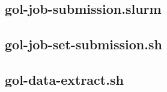 \documentclass[]{article}
\begin{document}


\newpage
\subsection{gol-job-submission.slurm}
\label{sec:gol-job-submission}



\newpage
\subsection{gol-job-set-submission.sh}
\label{sec:gol-job-set-submission}



\newpage
\subsection{gol-data-extract.sh}
\label{sec:gol-data-extract}


\end{document}
